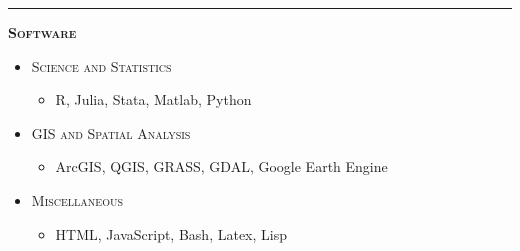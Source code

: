 \documentclass[12pt]{article}
\begin{document}
\newpage

\bigskip
\hrule
\bigskip 
\noindent \textsc{\large \textbf{Software}}

\begin{itemize}
\item[] \textsc{Science and Statistics}
\begin{itemize}[topsep=-1em, noitemsep]
\item[] R, Julia, Stata, Matlab, Python
\end{itemize}

\item[] \textsc{GIS and Spatial Analysis}
\begin{itemize}[topsep=-1em, noitemsep]
\item[] ArcGIS, QGIS, GRASS, GDAL, Google Earth Engine
\end{itemize}

\item[] \textsc{Miscellaneous} 
\begin{itemize}[topsep=-1em, noitemsep]
\item[] HTML, JavaScript, Bash, Latex, Lisp
\end{itemize}
\end{itemize}


\end{document}
